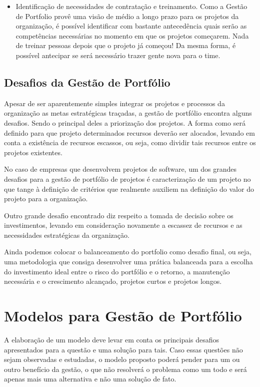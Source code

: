 \documentclass[12pt,a4paper,ruledheader,tocpage=prefix,floatnumber=continuous,pagestart=folhaderosto,font=times]{abnt}
\begin{document}
\begin{itemize}
 \item Identificação de necessidades de contratação e treinamento. Como a Gestão de Portfolio provê uma visão de médio a longo prazo para os projetos da organização, é possível identificar com bastante antecedência quais serão as competências necessárias no momento em que os projetos 
começarem. Nada de treinar pessoas depois que o projeto já começou! Da mesma forma, é possível antecipar se será necessário trazer gente nova para o time.
\end{itemize}

\section{Desafios da Gestão de Portfólio}
Apesar de ser aparentemente simples integrar os projetos e processos da organização as metas estratégicas traçadas, a gestão de portfólio encontra alguns 
desafios. Sendo o principal deles a priorização dos projetos. A forma como será definido para que projeto determinados recursos deverão ser alocados, 
levando em conta a existência de recursos escassos, ou seja, como dividir tais recursos entre os projetos existentes.

No caso de empresas que desenvolvem projetos de software, um dos grandes desafios para a gestão de portfólio de projetos é caracterização de um projeto 
no que tange à definição de critérios que realmente auxiliem na definição do valor do projeto para a organização.

Outro grande desafio encontrado diz respeito a tomada de decisão sobre os investimentos, levando em consideração novamente a escassez de recursos e as 
necessidades estratégicas da organização. 

Ainda podemos colocar o balanceamento do portfolio como desafio final, ou seja, uma metodologia que consiga 
desenvolver uma prática balanceada para a escolha do investimento ideal entre o risco do portfólio e o retorno, a manutenção necessária e o crescimento 
alcançado, projetos curtos e projetos longos.\cite{cooper}

\chapter{Modelos para Gestão de Portfólio} 
A elaboração de um modelo deve levar em conta os principais desafios apresentados para a questão e uma solução para tais. Caso essas questões não sejam 
observadas e estudadas, o modelo proposto poderá pender para um ou outro benefício da gestão, o que não resolverá o problema como um todo e será apenas 
mais  uma alternativa e não uma solução de fato. 
\end{document}
